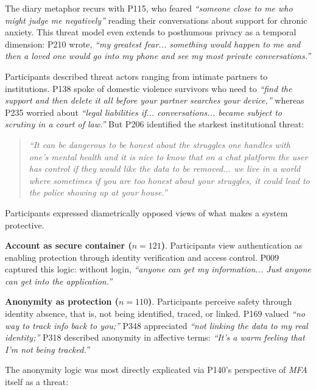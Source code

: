 \documentclass[letterpaper,twocolumn,10pt]{article}
\begin{document}
The diary metaphor recurs with P115, who feared \textit{``someone close to me who might judge me negatively''} reading their conversations about support for chronic anxiety. This threat model even extends to posthumous privacy as a temporal dimension: P210 wrote, \textit{``my greatest fear... something would happen to me and then a loved one would go into my phone and see my most private conversations.''}

 Participants described threat actors ranging from intimate partners to institutions. P138 spoke of domestic violence survivors who need to \textit{``find the support and then delete it all before your partner searches your device,''} whereas P235 worried about \textit{``legal liabilities if... conversations... became subject to scrutiny in a court of law.''} But P206 identified the starkest institutional threat:

\begin{quote}
\textit{``It can be dangerous to be honest about the struggles one handles with one's mental health and it is nice to know that on a chat platform the user has control if they would like the data to be removed... we live in a world where sometimes if you are too honest about your struggles, it could lead to the police showing up at your house.''}
\end{quote}

 Participants expressed diametrically opposed views of what makes a system protective. 

\textbf{Account as secure container ($n=121$)}. Participants view authentication as enabling protection through identity verification and access control. P009 captured this logic: without login, \textit{``anyone can get my information... Just anyone can get into the application.''}

\textbf{Anonymity as protection ($n=110$)}. Participants perceive safety through identity absence, that is, not being identified, traced, or linked. P169 valued \textit{``no way to track info back to you;''} P348 appreciated \textit{``not linking the data to my real identity;''} P318 described anonymity in affective terms: \textit{``It's a warm feeling that I'm not being tracked.''}

The anonymity logic was most directly explicated via P140's perspective of \emph{MFA} itself as a threat:
\end{document}
